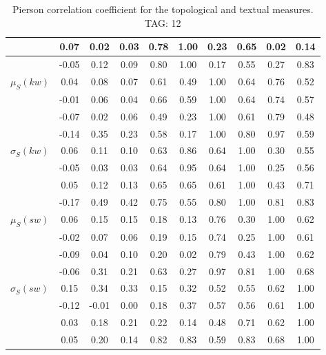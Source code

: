 \begin{table*}[h!]
\begin{center}
\begin{tabular}{| l | c | c | c | c | c | c | c | c | c |}
 & 0.07  & 0.02  & 0.03  & 0.78  & 1.00  & 0.23  & 0.65  & 0.02  & 0.14 \\\hline
 & -0.05  & 0.12  & 0.09  & 0.80  & 1.00  & 0.17  & 0.55  & 0.27  & 0.83 \\\hline
$\mu_S(kw)$ & 0.04  & 0.08  & 0.07  & 0.61  & 0.49  & 1.00  & 0.64  & 0.76  & 0.52 \\\hline
 & -0.01  & 0.06  & 0.04  & 0.66  & 0.59  & 1.00  & 0.64  & 0.74  & 0.57 \\\hline
 & -0.07  & 0.02  & 0.06  & 0.49  & 0.23  & 1.00  & 0.61  & 0.79  & 0.48 \\\hline
 & -0.14  & 0.35  & 0.23  & 0.58  & 0.17  & 1.00  & 0.80  & 0.97  & 0.59 \\\hline
$\sigma_S(kw)$ & 0.06  & 0.11  & 0.10  & 0.63  & 0.86  & 0.64  & 1.00  & 0.30  & 0.55 \\\hline
 & -0.05  & 0.03  & 0.03  & 0.64  & 0.95  & 0.64  & 1.00  & 0.25  & 0.56 \\\hline
 & 0.05  & 0.12  & 0.13  & 0.65  & 0.65  & 0.61  & 1.00  & 0.43  & 0.71 \\\hline
 & -0.17  & 0.49  & 0.42  & 0.75  & 0.55  & 0.80  & 1.00  & 0.81  & 0.83 \\\hline
$\mu_S(sw)$ & 0.06  & 0.15  & 0.15  & 0.18  & 0.13  & 0.76  & 0.30  & 1.00  & 0.62 \\\hline
 & -0.02  & 0.07  & 0.06  & 0.19  & 0.15  & 0.74  & 0.25  & 1.00  & 0.61 \\\hline
 & -0.09  & 0.04  & 0.10  & 0.20  & 0.02  & 0.79  & 0.43  & 1.00  & 0.62 \\\hline
 & -0.06  & 0.31  & 0.21  & 0.63  & 0.27  & 0.97  & 0.81  & 1.00  & 0.68 \\\hline
$\sigma_S(sw)$ & 0.15  & 0.34  & 0.33  & 0.15  & 0.32  & 0.52  & 0.55  & 0.62  & 1.00 \\\hline
 & -0.12  & -0.01  & 0.00  & 0.18  & 0.37  & 0.57  & 0.56  & 0.61  & 1.00 \\\hline
 & 0.03  & 0.18  & 0.21  & 0.22  & 0.14  & 0.48  & 0.71  & 0.62  & 1.00 \\\hline
 & 0.05  & 0.20  & 0.14  & 0.82  & 0.83  & 0.59  & 0.83  & 0.68  & 1.00 \\\hline
\end{tabular}
\caption{Pierson correlation coefficient for the topological and textual measures. TAG: 12}
\end{center}
\end{table*}